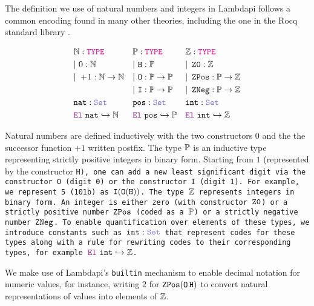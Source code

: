 \begin{definition}\label{def:ints}
The definition we use of natural numbers and integers in Lambdapi follows a common encoding found in many other theories, including the one in the Rocq standard library \cite{Rocq-refman}.

\begin{align*}\label{eq:eq1}
&\N: \type & &\bb{P}: \type & &\Z: \type \\
&|~0: \N  & &|~\tt{H} : \bb{P} & &|~\ZO: \Z \\
&|~+\!1:\N \ra \N & &|~\tt{O}: \bb{P} \ra \bb{P} & &|~\ZPos: \bb{P} \ra \Z \\
& & &|~\tt{I}: \bb{P} \ra \bb{P} & &|~\ZNeg: \bb{P} \ra \Z \\
&\tt{nat}: \set & &\tt{pos}: \set & &\tt{int}: \set \\
&\el~\tt{nat} \re \N & &\el~\tt{pos} \re \bb{P} & &\el~\tt{int} \re \Z
\end{align*}

Natural numbers are defined inductively with the two constructors $0$ and the the successor function $+\!1$ written postfix.
The type $\bb{P}$  is an inductive type representing strictly positive integers in binary form.
Starting from $1$ (represented by the constructor \tt{H}), one can add a new least significant digit via the constructor \tt{O} (digit 0) or the constructor \tt{I} (digit 1).
For example, we represent 5 (101b) as $\tt{I} (\tt{O} (\tt{H}))$. The type $\Z$ represents integers in binary form.
An integer is either zero (with constructor $\ZO$) or a strictly positive number $\ZPos$ (coded as a $\bb{P}$) or a strictly negative number $\ZNeg$.
To enable quantification over elements of these types, we introduce constants such as $\tt{int}:\set$ that represent codes for these types along with a rule for rewriting codes to their corresponding types, for example $\el~\tt{int} \re \Z$.
\end{definition}

We make use of Lambdapi's \lstinline[language=Lambdapi,basicstyle=\ttfamily\normalsize]|builtin| mechanism to enable decimal notation for numeric values, for instance, writing $2$ for $\ZPos (\mathop{\tt{O}} \tt{H})$ to convert natural representations of values into elements of $\Z$.

